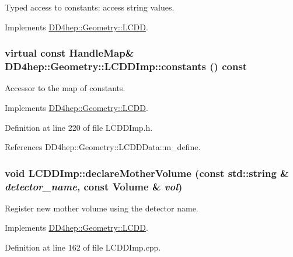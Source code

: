 Typed access to constants: access string values. 

Implements \hyperlink{class_d_d4hep_1_1_geometry_1_1_l_c_d_d_a6857611520c86f1d242a1698ab5c181f}{DD4hep::Geometry::LCDD}.\hypertarget{class_d_d4hep_1_1_geometry_1_1_l_c_d_d_imp_ad448fac04887abd5b7c6a0158e293c8c}{
\subsubsection[{constants}]{\setlength{\rightskip}{0pt plus 5cm}virtual const {\bf HandleMap}\& DD4hep::Geometry::LCDDImp::constants () const}}
\label{class_d_d4hep_1_1_geometry_1_1_l_c_d_d_imp_ad448fac04887abd5b7c6a0158e293c8c}


Accessor to the map of constants. 

Implements \hyperlink{class_d_d4hep_1_1_geometry_1_1_l_c_d_d_a14d6ac1a5de3cd514372ab8717b6420e}{DD4hep::Geometry::LCDD}.

Definition at line 220 of file LCDDImp.h.

References DD4hep::Geometry::LCDDData::m\_\-define.\hypertarget{class_d_d4hep_1_1_geometry_1_1_l_c_d_d_imp_ac8faeaaa5f56b48c6306cb3099f84568}{
\subsubsection[{declareMotherVolume}]{\setlength{\rightskip}{0pt plus 5cm}void LCDDImp::declareMotherVolume (const std::string \& {\em detector\_\-name}, \/  const {\bf Volume} \& {\em vol})}}
\label{class_d_d4hep_1_1_geometry_1_1_l_c_d_d_imp_ac8faeaaa5f56b48c6306cb3099f84568}


Register new mother volume using the detector name. 

Implements \hyperlink{class_d_d4hep_1_1_geometry_1_1_l_c_d_d_a6cbadc0074dd9cc3b88b5e0a527586a2}{DD4hep::Geometry::LCDD}.

Definition at line 162 of file LCDDImp.cpp.

